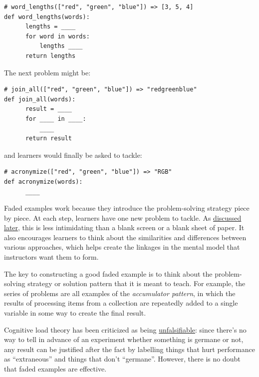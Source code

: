\documentclass[10pt,statementpaper]{memoir}
\begin{document}
\begin{verbatim}
# word_lengths(["red", "green", "blue"]) => [3, 5, 4]
def word_lengths(words):
      lengths = ____
      for word in words:
          lengths ____
      return lengths
\end{verbatim}

\newpage

\noindent
The next problem might be:

\begin{verbatim}
# join_all(["red", "green", "blue"]) => "redgreenblue"
def join_all(words):
      result = ____
      for ____ in ____:
          ____
      return result
\end{verbatim}

\noindent
and learners would finally be asked to tackle:

\begin{verbatim}
# acronymize(["red", "green", "blue"]) => "RGB"
def acronymize(words):
      ____
\end{verbatim}

Faded examples work because they introduce the problem-solving strategy
piece by piece. At each step, learners have one new problem to tackle.
As \href{practices.html\#never-a-blank-page}{discussed later}, this is
less intimidating than a blank screen or a blank sheet of paper. It also
encourages learners to think about the similarities and differences
between various approaches, which helps create the linkages in the
mental model that instructors want them to form.

The key to constructing a good faded example is to think about the
problem-solving strategy or solution pattern that it is meant to teach.
For example, the series of problems are all examples of the
\emph{accumulator pattern}, in which the results of processing items
from a collection are repeatedly added to a single variable in some way
to create the final result.

Cognitive load theory has been criticized as being
\href{https://edtechdev.wordpress.com/2009/11/16/cognitive-load-theory-failure/}{unfalsifiable}:
since there's no way to tell in advance of an experiment whether
something is germane or not, any result can be justified after the fact
by labelling things that hurt performance as ``extraneous'' and things
that don't ``germane''. However, there is no doubt that faded examples
are effective.
\end{document}
